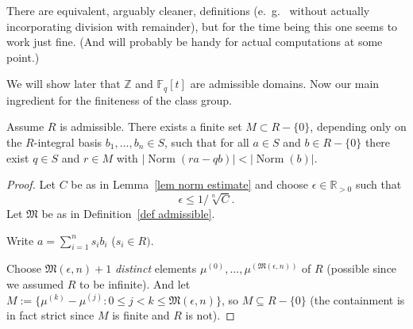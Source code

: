 \documentclass{amsart}
\newcommand{\Z}{\mathbb{Z}}
\newcommand{\R}{\mathbb{R}}
\newcommand{\Fq}{\mathbb{F}_q}
\newcommand{\M}{\mathfrak{M}}
\newcommand{\NN}{\operatorname{Norm}}
\begin{document}
There are equivalent, arguably cleaner, definitions (e.~g.~ without actually incorporating division with remainder), but for the time being this one seems to work just fine. (And will probably be handy for actual computations at some point.)

We will show later that $\Z$ and $\Fq[t]$ are admissible domains.
Now our main ingredient for the finiteness of the class group.

\begin{theorem} Assume $R$ is admissible.
There exists a finite set $M \subset R-\{0\}$, depending only on the $R$-integral basis $b_1,\ldots,b_n \in S$, such that
for all $a \in S$ and $b \in R-\{0\}$ there exist $q \in S$ and $r \in M$ with $|\NN(ra-qb)| < |\NN(b)|$.
\end{theorem}

\begin{proof}

Let $C$ be as in Lemma~\ref{lem norm estimate} and choose $\epsilon \in \R_{>0}$ such that
\begin{equation}\label{eqn choice epsilon}
\epsilon \leq 1/\sqrt[n]{C}.
\end{equation}
Let $\M$ be as in Definition~\ref{def admissible}.

Write $a=\sum_{i=1}^n s_i b_i$ ($s_i\in R)$.

Choose $\M(\epsilon,n)+1$ \emph{distinct} elements $\mu^{(0)},\ldots,\mu^{(\M(\epsilon,n))}$ of $R$ (possible since we assumed $R$ to be infinite).
And let $M:=\{\mu^{(k)}-\mu^{(j)} : 0\leq j<k\leq \M(\epsilon,n)\}$, so $M \subseteq R-\{0\}$ (the containment is in fact strict since $M$ is finite and $R$ is not).


\end{proof}
\end{document}
